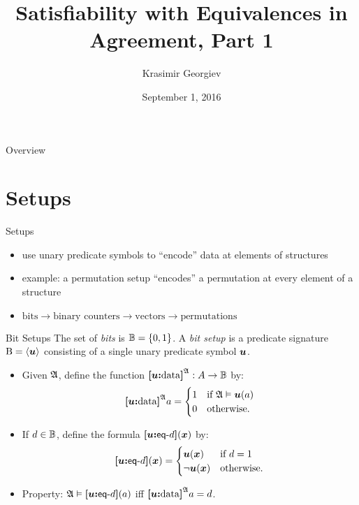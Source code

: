 \documentclass{beamer}
\begin{document}
\title{Satisfiability with Equivalences in Agreement, Part 1}
\author{Krasimir Georgiev}
\date{September 1, 2016}
\frame{\titlepage}

\begin{frame}{Overview}
\tableofcontents
\end{frame}

\section{Setups}
\begin{frame}{Setups}
\begin{itemize}
  \item
   use unary predicate symbols to ``encode'' data at elements of structures
  
  \item
  example: a permutation setup ``encodes'' a permutation at every
  element of a structure
  
  \item
  $\text{bits} \to \text{binary counters} \to \text{vectors} \to
  \text{permutations}$
\end{itemize}
\end{frame}

\begin{frame}{Bit Setups}
The set of \emph{bits} is $\mathbb{B} = \left\{0,1\right\}$.
A \emph{bit setup} is a predicate signature ${\mathrm{B}} = \left\langle \bm{u} \right\rangle$ consisting of a
single unary predicate symbol $\bm{u}$.
\begin{itemize}
  \item Given $\mathfrak{A}$, define the function ${\bm{[}\bm{u}\mathord{\bm{:}}\mathrm{data}\bm{]}}^{\mathfrak{A}} :
  A\to\mathbb{B}$ by:
  \[
    {\bm{[}\bm{u}\mathord{\bm{:}}\mathrm{data}\bm{]}}^{\mathfrak{A}} a = \begin{cases}
      1 &\text{if } \mathfrak{A} \vDash \bm{u}(a) \\
      0 &\text{otherwise.}
    \end{cases}
  \]
  
  \item
  If $d\in\mathbb{B}$, define the formula ${\bm{[}\bm{u}\mathord{\bm{:}}\mathsf{eq}{\hbox{-}}d\bm{]}}(\bm{x})$ by:
  \[
  {\bm{[}\bm{u}\mathord{\bm{:}}\mathsf{eq}{\hbox{-}}d\bm{]}}(\bm{x}) = \begin{cases}
    \bm{u}(\bm{x}) &\text{if } d = 1 \\
    \lnot\bm{u}(\bm{x}) &\text{otherwise.}
  \end{cases}
  \]
  
  \item Property: $\mathfrak{A}\vDash{\bm{[}\bm{u}\mathord{\bm{:}}\mathsf{eq}{\hbox{-}}d\bm{]}}(a)$ iff ${\bm{[}\bm{u}\mathord{\bm{:}}\mathrm{data}\bm{]}}^{\mathfrak{A}}a =
  d$.
\end{itemize}
\end{frame}
\end{document}
